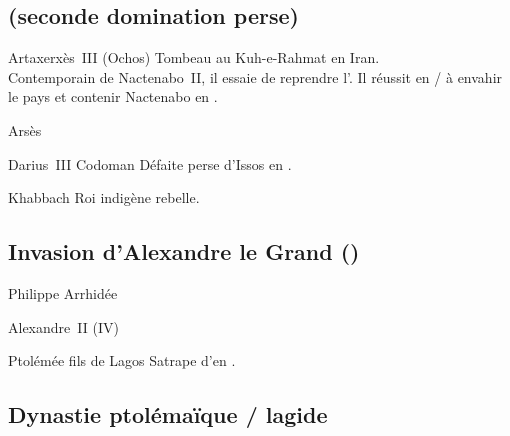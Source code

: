 \subsection{\texorpdfstring{}{XXXIe dynastie} (seconde 
domination perse)}

\begin{listerois}
  \item [Artaxerxès~III (Ochos) \datation{(\anorange{358}{338})}] 
        Tombeau au Kuh-e-Rahmat en Iran. \\ 
        Contemporain de Nactenabo~II, il essaie de reprendre l'\kmt.
        Il réussit en / à envahir le pays et 
        contenir Nactenabo en \HE.
  \item [Arsès] 
  \item [Darius~III Codoman \datation{(\anorange{335}{330})}] 
        Défaite perse d'Issos en .
  \item [Khabbach] Roi indigène rebelle.
\end{listerois}

\subsection{Invasion d'Alexandre le Grand ()}

\begin{listerois}
  \item [Philippe Arrhidée]
  \item [Alexandre~II (IV)]
  \item [Ptolémée fils de Lagos] Satrape d'\kmt en .
\end{listerois}

\subsection{Dynastie ptolémaïque / lagide}

